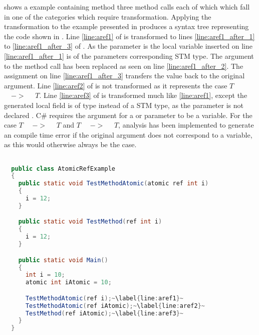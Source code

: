  shows a example containing method three method calls each of which which fall in one of the categories which require transformation. Applying the transformation to the example presented in  produces a syntax tree representing the code shown in . Line \ref{line:aref1} of  is transformed to lines \ref{line:aref1_after_1} to \ref{line:aref1_after_3} of . As the parameter is  the local variable inserted on line \ref{line:aref1_after_1} is of the parameters corresponding \ac{STM} type. The argument to the method call has been replaced as seen on line \ref{line:aref1_after_2}. The assignment on line \ref{line:aref1_after_3} transfers the value back to the original argument. Line \ref{line:aref2} of  is not transformed as it represents the case  $T$ $\quad->\quad$  $T$. Line \ref{line:aref3} of  is transformed much like \ref{line:aref1}, except the generated local field is of type  instead of a \ac{STM} type, as the parameter is not declared . C\# requires the argument for a  or  parameter to be a variable. For the case $T$ $\quad->\quad$  $T$ and  $T$ $\quad->\quad$ $T$, analysis has been implemented to generate an compile time error if the original argument does not correspond to a variable, as this would otherwise always be the case.


\begin{lstlisting}[label=lst:before_atomic_ref,
  caption={\bscode{ref} Arguments Before Transformation},
  language=Java,  
  showspaces=false,
  showtabs=false,
  breaklines=true,
  showstringspaces=false,
  breakatwhitespace=true,
  escapechar=~,
  commentstyle=\color{greencomments},
  keywordstyle=\color{bluekeywords},
  stringstyle=\color{redstrings},
  morekeywords={atomic, retry, orelse, var, get, set, ref, out}]  % Start your code-block

  public class AtomicRefExample
  {
    public static void TestMethodAtomic(atomic ref int i)
    {
      i = 12;
    }

    public static void TestMethod(ref int i)
    {
      i = 12;
    }

    public static void Main()
    {
      int i = 10;
      atomic int iAtomic = 10;

      TestMethodAtomic(ref i);~\label{line:aref1}~
      TestMethodAtomic(ref iAtomic);~\label{line:aref2}~
      TestMethod(ref iAtomic);~\label{line:aref3}~
    }
  }
\end{lstlisting}

